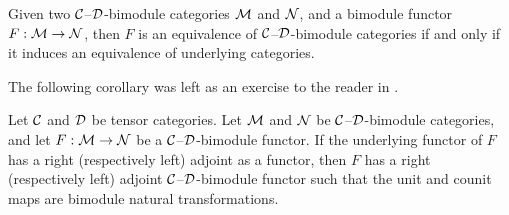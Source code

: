 \documentclass{amsart}
\begin{document}
\begin{corollary}\label{cor:Recog_equiv_of_bimod}
	Given two $\mathcal C$--$\mathcal D$-bimodule categories $\mathcal M$ and $\mathcal N$, and a bimodule functor $F:\mathcal M \to \mathcal N$, then $F$ is an equivalence of $\mathcal C$--$\mathcal D$-bimodule categories if and only if it induces an equivalence of underlying categories.
\end{corollary}

%	

The following corollary was left as an exercise to the reader in \cite[\S 3.3]{EO-ftc}.
\begin{corollary} \label{cor:module-adjoint}
Let $\mathcal C$ and $\mathcal D$ be tensor categories. Let  $\mathcal M$ and  $\mathcal N$  be  $\mathcal C$--$\mathcal D$-bimodule categories, and let $F: \mathcal M \to \mathcal N$ be a $\mathcal C$--$\mathcal D$-bimodule functor.  If the underlying functor of $F$ has a right (respectively left) adjoint as a functor, then $F$ has a right (respectively left) adjoint $\mathcal C$--$\mathcal D$-bimodule functor such that the unit and counit maps are bimodule natural transformations.   
\end{corollary}
\end{document}
